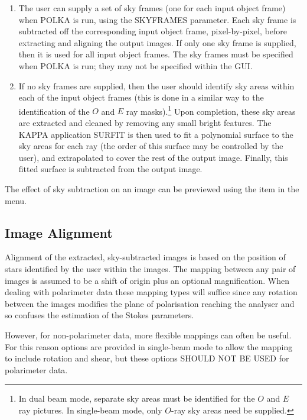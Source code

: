\begin{enumerate}

\item The user can supply a set of sky frames (one for each input object
frame) when POLKA is run, using the SKYFRAMES parameter. Each sky
frame is subtracted off the corresponding input object frame,
pixel-by-pixel, before extracting and aligning the output images. If only
one sky frame is supplied, then it is used for all input object frames.
The sky frames must be specified when POLKA is run; they may not be
specified within the GUI.

\item If no sky frames are supplied, then the user should identify sky areas
within each of the input object frames (this is done in a similar way to
the identification of the $O$ and $E$ ray masks).\footnote{In dual beam
mode, separate sky areas must be identified for the $O$ and $E$ ray
pictures. In single-beam mode, only $O$-ray sky areas need be supplied.}
Upon completion, these sky areas are extracted and cleaned by removing
any small bright features. The KAPPA application SURFIT is then used to
fit a polynomial surface to the sky areas for each ray (the
order of this surface may be controlled by the user), and
extrapolated to cover the rest of the output image. Finally, this fitted
surface is subtracted from the output image.

\end{enumerate}

The effect of sky subtraction on an image can be previewed using the
 item in the 
 menu.

\subsection{Image Alignment}
Alignment of the extracted, sky-subtracted images is based on the
position of stars identified by the user within the images. The mapping
between any pair of images is assumed to be a shift of origin plus an
optional magnification. When dealing with polarimeter data these mapping
types will suffice since any rotation between the images modifies the 
plane of polarisation reaching the analyser and so confuses the
estimation of the Stokes parameters.

However, for non-polarimeter data, more flexible mappings can often be
useful. For this reason options are provided in single-beam mode to allow
the mapping to include rotation and shear, but these options SHOULD NOT
BE USED for polarimeter data.

